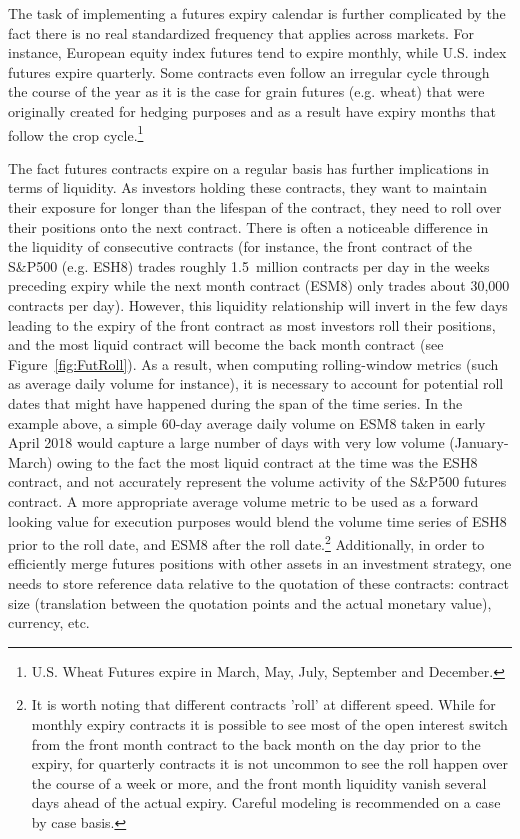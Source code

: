 \begin{itemize}
The task of implementing a futures expiry calendar is further complicated by the fact there is no real standardized frequency that applies across markets. For instance, European equity index futures tend to expire monthly, while U.S. index futures expire quarterly. Some contracts even follow an irregular cycle through the course of the year as it is the case for grain futures (e.g. wheat) that were originally created for hedging purposes and as a result have expiry months that follow the crop cycle.\footnote{U.S. Wheat Futures expire in March, May, July, September and December.}


The fact futures contracts expire on a regular basis has further implications in terms of liquidity. As investors holding these contracts, they want to maintain their exposure for longer than the lifespan of the contract, they need to roll over their positions onto the next contract. There is often a noticeable difference in the liquidity of consecutive contracts (for instance, the front contract of the S\&P500 (e.g. ESH8) trades roughly 1.5~million contracts per day in the weeks preceding expiry while the next month contract (ESM8) only trades about 30,000 contracts per day). However, this liquidity relationship will invert in the few days leading to the expiry of the front contract as most investors roll their positions, and the most liquid contract will become the back month contract (see Figure~\ref{fig:FutRoll}). As a result, when computing rolling-window metrics (such as average daily volume for instance), it is necessary to account for potential roll dates that might have happened during the span of the time series. In the example above, a simple 60-day average daily volume on ESM8 taken in early April 2018 would capture a large number of days with very low volume (January-March) owing to the fact the most liquid contract at the time was the ESH8 contract, and not accurately represent the volume activity of the S\&P500 futures contract. A more appropriate average volume metric to be used as a forward looking value for execution purposes would blend the volume time series of ESH8 prior to the roll date, and ESM8 after the roll date.\footnote{It is worth noting that different contracts 'roll' at different speed. While for monthly expiry contracts it is possible to see most of the open interest switch from the front month contract to the back month on the day prior to the expiry, for quarterly contracts it is not uncommon to see the roll happen over the course of a week or more, and the front month liquidity vanish several days ahead of the actual expiry. Careful modeling is recommended on a case by case basis.} Additionally, in order to efficiently merge futures positions with other assets in an investment strategy, one needs to store reference data relative to the quotation of these contracts: contract size (translation between the quotation points and the actual monetary value), currency, etc. 


\end{itemize}
